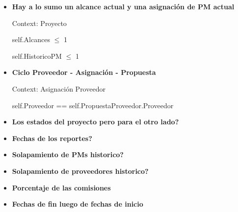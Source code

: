 \begin{itemize}
	\item \textbf{Hay a lo sumo un alcance actual y una asignación de PM actual}
	
			Context: Proyecto
			
			self.Alcances $\leq$ 1
			
			self.HistoricoPM $\leq$ 1
			
	\item \textbf{Ciclo Proveedor - Asignaci\'on - Propuesta}
	
			Context: Asignación Proveedor
			
			self.Proveedor == self.PropuestaProveedor.Proveedor
	
	\item \textbf{Los estados del proyecto pero para el otro lado?}
	\item \textbf{Fechas de los reportes?}
	\item \textbf{Solapamiento de PMs historico?}
	\item \textbf{Solapamiento de proveedores historico?}
	\item \textbf{Porcentaje de las comisiones}
	\item \textbf{Fechas de fin luego de fechas de inicio}
	
\end{itemize}
